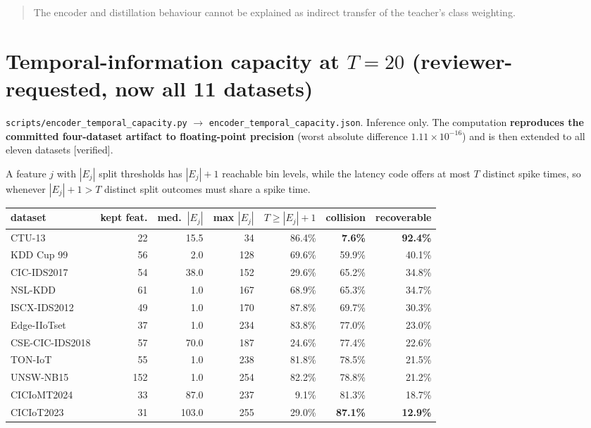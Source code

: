 \begin{quote}
The encoder and distillation behaviour cannot be explained as indirect transfer of the
teacher's class weighting.
\end{quote}

\section*{Temporal-information capacity at $T=20$ (reviewer-requested, now all 11 datasets)}

\texttt{scripts/encoder\_temporal\_capacity.py} $\rightarrow$
\texttt{encoder\_temporal\_capacity.json}. Inference only. The computation
\textbf{reproduces the committed four-dataset artifact to floating-point precision}
(worst absolute difference $1.11\times10^{-16}$) and is then extended to all eleven
datasets \textup{[verified]}.

A feature $j$ with $|E_j|$ split thresholds has $|E_j|+1$ reachable bin levels, while the
latency code offers at most $T$ distinct spike times, so whenever $|E_j|+1 > T$ distinct
split outcomes must share a spike time.

\begin{center}\scriptsize
\begin{tabular}{lrrrrrr}\toprule
dataset & kept feat. & med.\ $|E_j|$ & max $|E_j|$ & $T\!\geq\!|E_j|{+}1$ & collision &
recoverable \\\midrule
CTU-13          &  22 &  15.5 &  34 & 86.4\% & \textbf{7.6\%}  & \textbf{92.4\%} \\
KDD Cup 99      &  56 &   2.0 & 128 & 69.6\% & 59.9\% & 40.1\% \\
CIC-IDS2017     &  54 &  38.0 & 152 & 29.6\% & 65.2\% & 34.8\% \\
NSL-KDD         &  61 &   1.0 & 167 & 68.9\% & 65.3\% & 34.7\% \\
ISCX-IDS2012    &  49 &   1.0 & 170 & 87.8\% & 69.7\% & 30.3\% \\
Edge-IIoTset    &  37 &   1.0 & 234 & 83.8\% & 77.0\% & 23.0\% \\
CSE-CIC-IDS2018 &  57 &  70.0 & 187 & 24.6\% & 77.4\% & 22.6\% \\
TON-IoT         &  55 &   1.0 & 238 & 81.8\% & 78.5\% & 21.5\% \\
UNSW-NB15       & 152 &   1.0 & 254 & 82.2\% & 78.8\% & 21.2\% \\
CICIoMT2024     &  33 &  87.0 & 237 &  9.1\% & 81.3\% & 18.7\% \\
CICIoT2023      &  31 & 103.0 & 255 & 29.0\% & \textbf{87.1\%} & \textbf{12.9\%} \\
\bottomrule\end{tabular}\end{center}

